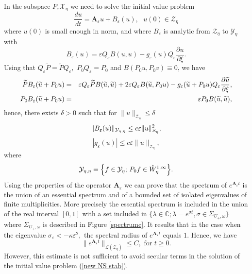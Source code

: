 \documentclass[11pt]{article}
\begin{document}
In the subspace $P_{\varepsilon }\mathcal{X}_{\eta}$ we need to solve the
initial value problem%
\begin{equation}
\frac{du}{dt}=\boldsymbol{A}_{\varepsilon }u+B_{\varepsilon }(u),\text{ }%
u(0)\in \mathcal{Z}_{\eta}  \label{new NS stab}
\end{equation}%
where $u(0)$ is small enough in norm, and where $B_{\varepsilon }$ is analytic
from $\mathcal{Z}_{\eta}$ to $\mathcal{Y}_{\eta}$ with%
\begin{equation*}
B_{\varepsilon }(u)=\varepsilon Q_{\varepsilon }B(u,u)-g_{\varepsilon
}(u)Q_{\varepsilon }\frac{\partial u}{\partial \xi }.
\end{equation*}%
Using that $Q_{\varepsilon }\widetilde{P}=%
\widetilde{P}Q_{\varepsilon },$ $P_{0}Q_{\varepsilon }=P_{0}$ and $%
B(P_{0}u,P_{0}v)\equiv 0$, we have
\begin{eqnarray*}
\widetilde{P}B_{\varepsilon }(\widetilde{u}+P_{0}u) &=&\varepsilon
Q_{\varepsilon }\widetilde{P}B(\widetilde{u},\widetilde{u})+2\varepsilon
Q_{\varepsilon }B(\widetilde{u},P_{0}u)-g_{\varepsilon }(\widetilde{u}%
+P_{0}u)Q_{\varepsilon }\frac{\partial \widetilde{u}}{\partial \xi }, \\
P_{0}B_{\varepsilon }(\widetilde{u}+P_{0}u) &=&\varepsilon P_{0}B(\widetilde{%
u},\widetilde{u}),
\end{eqnarray*}%
hence, there exists $\delta >0$ such that for $\|u\|_{\mathcal{Z}_{\eta}}\leq
\delta $ 
\begin{equation}
\|B_{\varepsilon }(u)\|_{\mathcal{Y}_{\eta,\eta}}\leq c\varepsilon \|u\|_{\mathcal{%
Z}_{\eta}}^{2},  \label{estimBeps}
\end{equation}%
\begin{equation*}
|g_{\varepsilon }(u)|\leq c\varepsilon \|u\|_{\mathcal{Z}_{\eta}},
\end{equation*}%
where%
\begin{equation*}
\mathcal{Y}_{\eta,\eta}=\Bigl\{f\in \mathcal{Y}_{\eta}; \, P_{0}f\in \mathring{W}%
_{\eta}^{1,\infty }\Bigr\}.
\end{equation*}
Using the properties of the operator $\boldsymbol{A}_{\varepsilon }$ we can
prove that the spectrum of $e^{\boldsymbol{A}_{\varepsilon }t}$ is the union
of an essential spectrum and of a bounded set of isolated eigenvalues of finite
multiplicities. More precisely the essential spectrum is included in the
union of the real interval $[0,1]$ with a set included in $\{\lambda \in 
\mathbb{C};\lambda =e^{\sigma t},\sigma \in \Sigma _{U_+,\omega }\}$ where $%
\Sigma _{U_+,\omega }$ is described in Figure \ref{spectrumc}. It results that in the
case when the eigenvalue $\sigma _{\varepsilon }<-\kappa \varepsilon ^{2},$
the spectral radius of $e^{\boldsymbol{A}_{\varepsilon }t}$ equals $1$. Hence,
we have 
\begin{equation*}
\|e^{\boldsymbol{A}_{\varepsilon }t}\|_{\mathcal{L}(\mathcal{Z}_{\eta})}\leq C,%
\text{ for }t\geq 0.
\end{equation*}%
However, this estimate is not sufficient to avoid secular terms in the
solution of the initial value problem (\ref{new NS stab}).
\end{document}
